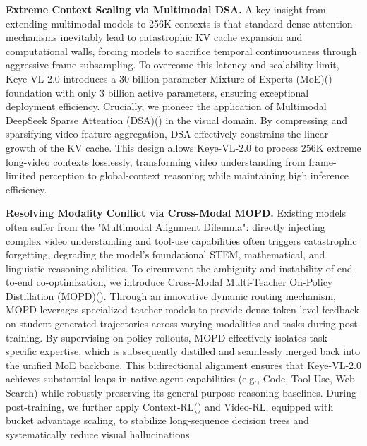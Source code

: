 \documentclass{llmxive}
\begin{document}
\textbf{Extreme Context Scaling via Multimodal DSA.} A key insight from extending multimodal models to 256K contexts is that standard dense attention mechanisms inevitably lead to catastrophic KV cache expansion and computational walls, forcing models to sacrifice temporal continuousness through aggressive frame subsampling. To overcome this latency and scalability limit, Keye-VL-2.0 introduces a 30-billion-parameter Mixture-of-Experts (MoE)(\cite{shazeer2017outrageously}) foundation with only 3 billion active parameters, ensuring exceptional deployment efficiency. Crucially, we pioneer the application of Multimodal DeepSeek Sparse Attention (DSA)(\cite{deepseek2025v32}) in the visual domain. By compressing and sparsifying video feature aggregation, DSA effectively constrains the linear growth of the KV cache. This design allows Keye-VL-2.0 to process 256K extreme long-video contexts losslessly, transforming video understanding from frame-limited perception to global-context reasoning while maintaining high inference efficiency.

\textbf{Resolving Modality Conflict via Cross-Modal MOPD.} Existing models often suffer from the "Multimodal Alignment Dilemma": directly injecting complex video understanding and tool-use capabilities often triggers catastrophic forgetting, degrading the model's foundational STEM, mathematical, and linguistic reasoning abilities. To circumvent the ambiguity and instability of end-to-end co-optimization, we introduce Cross-Modal Multi-Teacher On-Policy Distillation (MOPD)(\cite{mimoteam2026v2flash}). Through an innovative dynamic routing mechanism, MOPD leverages specialized teacher models to provide dense token-level feedback on student-generated trajectories across varying modalities and tasks during post-training. By supervising on-policy rollouts, MOPD effectively isolates task-specific expertise, which is subsequently distilled and seamlessly merged back into the unified MoE backbone. This bidirectional alignment ensures that Keye-VL-2.0 achieves substantial leaps in native agent capabilities (e.g., Code, Tool Use, Web Search) while robustly preserving its general-purpose reasoning baselines. During post-training, we further apply Context-RL(\cite{lu2026contextrl}) and Video-RL, equipped with bucket advantage scaling, to stabilize long-sequence decision trees and systematically reduce visual hallucinations.
\end{document}
